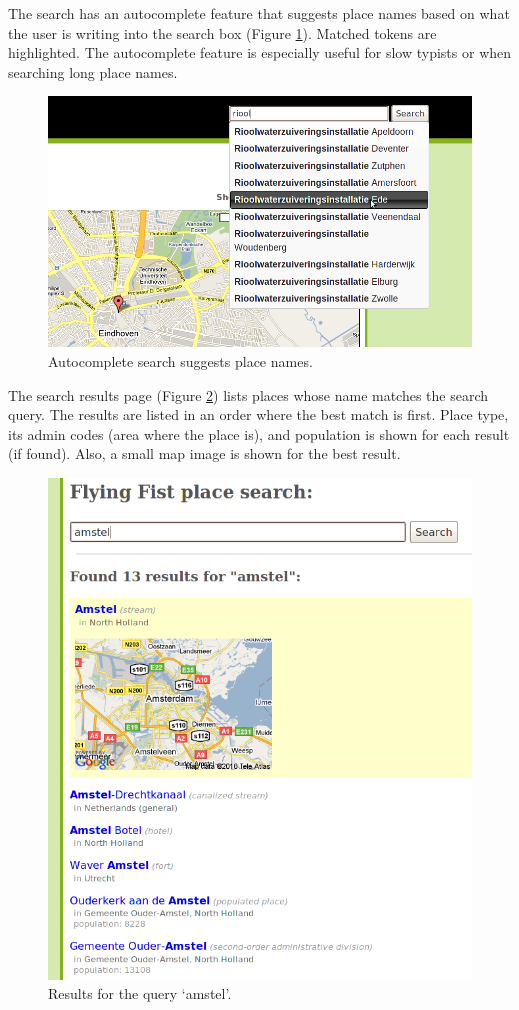 \documentclass[a4paper,12pt]{article}
\begin{document}
\noindent The search has an autocomplete feature that suggests place
names based on what the user is writing into the search box (Figure
\ref{autocomplete}). Matched tokens are highlighted. The autocomplete
feature is especially useful for slow typists or when searching long
place names.

\begin{figure}[h]
  \includegraphics[width=\linewidth]{img/autocomplete.png}
  \caption{Autocomplete search suggests place names.}
  \label{autocomplete}
\end{figure}

The search results page (Figure \ref{search}) lists places whose name
matches the search query. The results are listed in an order where the
best match is first. Place type, its admin codes (area where the place
is), and population is shown for each result (if found). Also, a small
map image is shown for the best result.

\begin{figure}[h]
  \includegraphics[width=\linewidth]{img/search.png}
  \caption{Results for the query `amstel'.}
  \label{search}
\end{figure}
\end{document}
